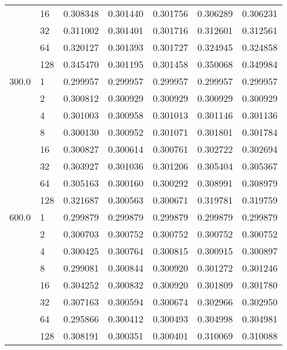 \begin{tabular}{llrrrrr}
      & 16  &  0.308348 &  0.301440 &  0.301756 &  0.306289 &  0.306231 \\
      & 32  &  0.311002 &  0.301401 &  0.301716 &  0.312601 &  0.312561 \\
      & 64  &  0.320127 &  0.301393 &  0.301727 &  0.324945 &  0.324858 \\
      & 128 &  0.345470 &  0.301195 &  0.301458 &  0.350068 &  0.349984 \\
300.0 & 1   &  0.299957 &  0.299957 &  0.299957 &  0.299957 &  0.299957 \\
      & 2   &  0.300812 &  0.300929 &  0.300929 &  0.300929 &  0.300929 \\
      & 4   &  0.301003 &  0.300958 &  0.301013 &  0.301146 &  0.301136 \\
      & 8   &  0.300130 &  0.300952 &  0.301071 &  0.301801 &  0.301784 \\
      & 16  &  0.300827 &  0.300614 &  0.300761 &  0.302722 &  0.302694 \\
      & 32  &  0.303927 &  0.301036 &  0.301206 &  0.305404 &  0.305367 \\
      & 64  &  0.305163 &  0.300160 &  0.300292 &  0.308991 &  0.308979 \\
      & 128 &  0.321687 &  0.300563 &  0.300671 &  0.319781 &  0.319759 \\
600.0 & 1   &  0.299879 &  0.299879 &  0.299879 &  0.299879 &  0.299879 \\
      & 2   &  0.300703 &  0.300752 &  0.300752 &  0.300752 &  0.300752 \\
      & 4   &  0.300425 &  0.300764 &  0.300815 &  0.300915 &  0.300897 \\
      & 8   &  0.299081 &  0.300844 &  0.300920 &  0.301272 &  0.301246 \\
      & 16  &  0.304252 &  0.300832 &  0.300920 &  0.301809 &  0.301780 \\
      & 32  &  0.307163 &  0.300594 &  0.300674 &  0.302966 &  0.302950 \\
      & 64  &  0.295866 &  0.300412 &  0.300493 &  0.304998 &  0.304981 \\
      & 128 &  0.308191 &  0.300351 &  0.300401 &  0.310069 &  0.310088 \\
\bottomrule
\end{tabular}
